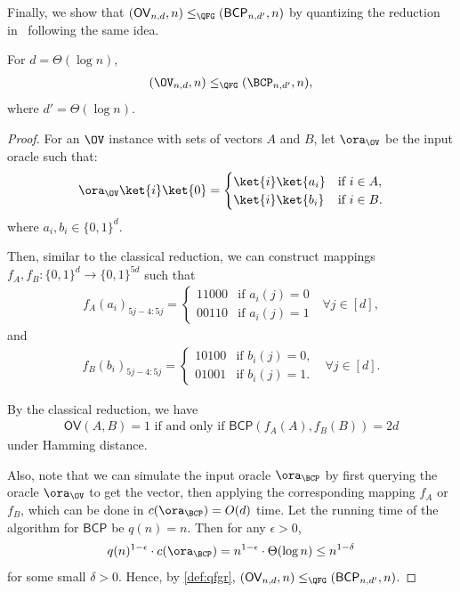 Finally, we show that $(\textsf{OV}_{n,d},n)\leq_{\QFG} (\textsf{BCP}_{n,d'},n)$ by quantizing the reduction in~\cite{r29} following the same idea. 
\begin{lemma}\label{lem:ov_q_bcp}
For $d=\Theta(\log n)$, 
\begin{align} 
    (\OV_{n,d},n)\leq_{\QFG} (\BCP_{n,d'},n),
\end{align}
where $d'=\Theta(\log n)$.
\end{lemma}
\begin{proof}
For an $\OV$ instance with sets of vectors $A$ and $B$, let $\ora_{\OV}$ be the input oracle such that:
\begin{align}
    \ora_{\OV}\ket{i}\ket{0}=\begin{cases}
        \ket{i}\ket{a_i} & \text{if }i\in A,\\
        \ket{i}\ket{b_i} & \text{if }i\in B.
    \end{cases}
\end{align}
where $a_i,b_i\in \{0,1\}^d$.

Then, similar to the classical reduction, we can construct mappings $f_A, f_B:\{0,1\}^d\rightarrow \{0,1\}^{5d}$ such that
\begin{align}
    f_A(a_i)_{5j-4:5j}=\begin{cases}
        11000 & \text{if }a_i(j)=0\\
        00110 & \text{if }a_i(j)=1
    \end{cases}~~~\forall j\in [d],
\end{align}
and
\begin{align}
    f_B(b_i)_{5j-4:5j}=\begin{cases}
        10100 & \text{if }b_i(j)=0,\\
        01001 & \text{if }b_i(j)=1.
    \end{cases} ~~~\forall j\in [d].
\end{align}

By the classical reduction, we have
\begin{align}
    \textsf{OV}(A,B)=1 \text{ if and only if }\textsf{BCP}(f_A(A),f_B(B))=2d
\end{align}
under Hamming distance. 

Also, note that we can simulate the input oracle $\ora_{\BCP}$ by first querying the oracle $\ora_{\OV}$ to get the vector, then applying the corresponding mapping $f_A$ or $f_B$, which can be done in $c(\ora_{\BCP})=O(d)$ time. Let the running time of the algorithm for $\textsf{BCP}$ be $q(n)=n$. Then for any $\epsilon>0$,
\begin{align}
    q(n)^{1-\epsilon}\cdot c(\ora_{\BCP})=n^{1-\epsilon}\cdot \Theta(\log n)\leq n^{1-\delta}
\end{align}
for some small $\delta >0$. Hence, by \cref{def:qfgr}, $(\textsf{OV}_{n,d},n)\leq_{\QFG} (\textsf{BCP}_{n,d'},n)$.
\end{proof}
 
